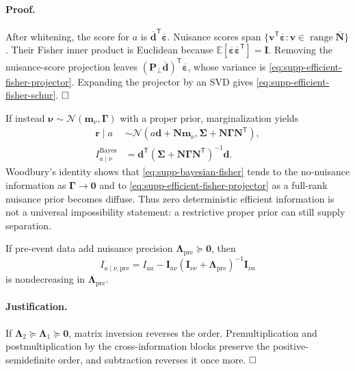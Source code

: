 \paragraph{Proof.}
After whitening, the score for $a$ is
$\overline{\bm d}^{\mathsf T}\overline{\bm\varepsilon}$.
Nuisance scores span
$\{\bm v^{\mathsf T}\overline{\bm\varepsilon}:\bm v\in\operatorname{range}\overline{\bm N}\}$.
Their Fisher inner product is Euclidean because
$\mathbb E[\overline{\bm\varepsilon}\overline{\bm\varepsilon}^{\mathsf T}]=\bm I$.
Removing the nuisance-score projection leaves
$(\bm P_{\perp}\overline{\bm d})^{\mathsf T}\overline{\bm\varepsilon}$,
whose variance is \eqref{eq:supp-efficient-fisher-projector}. Expanding the projector by an SVD gives \eqref{eq:supp-efficient-fisher-schur}. $\hfill\square$

If instead $\bm\nu\sim\mathcal N(\bm m_{\nu},\bm\Gamma)$ with a proper prior, marginalization yields
\begin{align}
 \bm r\mid a&\sim\mathcal N(a\bm d+\bm N\bm m_{\nu},
 \bm\Sigma+\bm N\bm\Gamma\bm N^{\mathsf T}),\label{eq:supp-nuisance-marginal}\\
 I_{a\mid\nu}^{\mathrm{Bayes}}
 &=\bm d^{\mathsf T}(\bm\Sigma+\bm N\bm\Gamma\bm N^{\mathsf T})^{-1}\bm d.
 \label{eq:supp-bayesian-fisher}
\end{align}
Woodbury's identity shows that \eqref{eq:supp-bayesian-fisher} tends to the no-nuisance information as $\bm\Gamma\rightarrow\bm0$ and to \eqref{eq:supp-efficient-fisher-projector} as a full-rank nuisance prior becomes diffuse. Thus zero deterministic efficient information is not a universal impossibility statement: a restrictive proper prior can still supply separation.

\begin{corollary}
If pre-event data add nuisance precision $\bm\Lambda_{\mathrm{pre}}\succeq\bm0$, then
\begin{equation}
 I_{a\mid\nu,\mathrm{pre}}
 =I_{aa}-\bm I_{a\nu}
 (\bm I_{\nu\nu}+\bm\Lambda_{\mathrm{pre}})^{-1}\bm I_{\nu a}
 \label{eq:supp-preevent-fisher}
\end{equation}
is nondecreasing in $\bm\Lambda_{\mathrm{pre}}$.
\end{corollary}

\paragraph{Justification.}
If $\bm\Lambda_2\succeq\bm\Lambda_1\succeq\bm0$, matrix inversion reverses the order. Premultiplication and postmultiplication by the cross-information blocks preserve the positive-semidefinite order, and subtraction reverses it once more. $\hfill\square$


